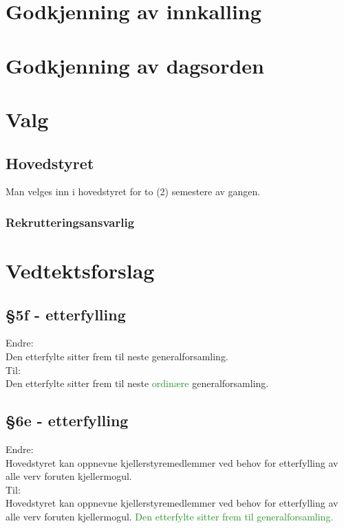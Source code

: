 \documentclass[10pt,norsk,a4paper,usenames,dvipsnames]{article}
\begin{document}
\section{Godkjenning av innkalling}


\section{Godkjenning av dagsorden}


\section{Valg}

    \subsection{Hovedstyret}
        Man velges inn i hovedstyret for to (2) semestere av gangen.

    
    \subsubsection{Rekrutteringsansvarlig}
    

\newpage

\section{Vedtektsforslag}

    \subsection{§5f - etterfylling}
        Endre:
        \\Den etterfylte sitter frem til neste generalforsamling.
        \\Til:
        \\Den etterfylte sitter frem til neste \textcolor{ForestGreen}{ordinære} generalforsamling.
        
    \subsection{§6e - etterfylling}
        Endre:
        \\Hovedstyret kan oppnevne kjellerstyremedlemmer ved behov for etterfylling av alle verv foruten kjellermogul.
        \\Til:
        \\Hovedstyret kan oppnevne kjellerstyremedlemmer ved behov for etterfylling av alle verv foruten kjellermogul. \textcolor{ForestGreen}{Den etterfylte sitter frem til generalforsamling.}
\end{document}

